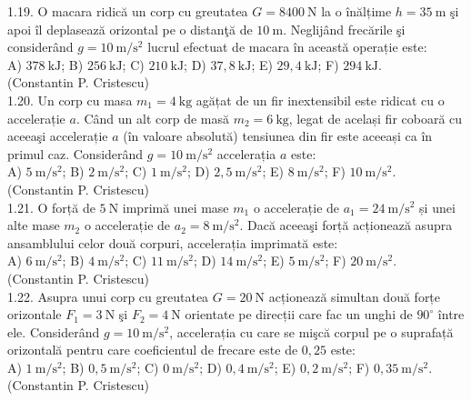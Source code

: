 1.19. O macara ridică un corp cu greutatea $G=8400 \mathrm{~N}$ la o înălțime $h=35 \mathrm{~m}$ şi apoi îl deplasează orizontal pe o distanţă de $10 \mathrm{~m}$. Neglijând frecările şi considerând $g=10 \mathrm{~m} / \mathrm{s}^{2}$ lucrul efectuat de macara în această operație este:\\ A) $378 \mathrm{~kJ}$; B) $256 \mathrm{~kJ}$; C) $210 \mathrm{~kJ}$; D) $37,8 \mathrm{~kJ}$; E) $29,4 \mathrm{~kJ}$; F) $294 \mathrm{~kJ}$.\\ (Constantin P. Cristescu)\\

1.20. Un corp cu masa $m_{1}=4 \mathrm{~kg}$ agățat de un fir inextensibil este ridicat cu o accelerație $a$. Când un alt corp de masă $m_{2}=6 \mathrm{~kg}$, legat de același fir coboară cu aceeaşi accelerație $a$ (în valoare absolută) tensiunea din fir este aceeași ca în primul caz. Considerând $g=10 \mathrm{~m} / \mathrm{s}^{2}$ accelerația $a$ este:\\ A) $5 \mathrm{~m} / \mathrm{s}^{2}$; B) $2 \mathrm{~m} / \mathrm{s}^{2}$; C) $1 \mathrm{~m} / \mathrm{s}^{2}$; D) $2,5 \mathrm{~m} / \mathrm{s}^{2}$; E) $8 \mathrm{~m} / \mathrm{s}^{2}$; F) $10 \mathrm{~m} / \mathrm{s}^{2}$.\\ (Constantin P. Cristescu)\\

1.21. O forță de $5 \mathrm{~N}$ imprimă unei mase $m_{1}$ o accelerație de $a_{1}=24 \mathrm{~m} / \mathrm{s}^{2}$ și unei alte mase $m_{2}$ o accelerație de $a_{2}=8 \mathrm{~m} / \mathrm{s}^{2}$. Dacă aceeaşi forță acționează asupra ansamblului celor două corpuri, accelerația imprimată este:\\ A) $6 \mathrm{~m} / \mathrm{s}^{2}$; B) $4 \mathrm{~m} / \mathrm{s}^{2}$; C) $11 \mathrm{~m} / \mathrm{s}^{2}$; D) $14 \mathrm{~m} / \mathrm{s}^{2}$; E) $5 \mathrm{~m} / \mathrm{s}^{2}$; F) $20 \mathrm{~m} / \mathrm{s}^{2}$.\\ (Constantin P. Cristescu)\\

1.22. Asupra unui corp cu greutatea $G=20 \mathrm{~N}$ acționează simultan două forțe orizontale $F_{1}=3 \mathrm{~N}$ şi $F_{2}=4 \mathrm{~N}$ orientate pe direcții care fac un unghi de $90^{\circ}$ între ele. Considerând $g=10 \mathrm{~m} / \mathrm{s}^{2}$, accelerația cu care se mişcă corpul pe o suprafață orizontală pentru care coeficientul de frecare este de $0,25$ este:\\ A) $1 \mathrm{~m} / \mathrm{s}^{2}$; B) $0,5 \mathrm{~m} / \mathrm{s}^{2}$; C) $0 \mathrm{~m} / \mathrm{s}^{2}$; D) $0,4 \mathrm{~m} / \mathrm{s}^{2}$; E) $0,2 \mathrm{~m} / \mathrm{s}^{2}$; F) $0,35 \mathrm{~m} / \mathrm{s}^{2}$.\\ (Constantin P. Cristescu)\\

